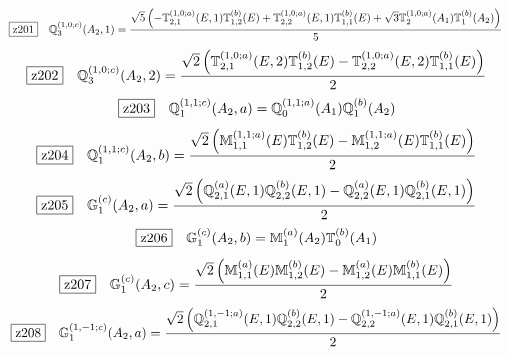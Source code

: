 \documentclass[fleqn,10pt,landscape]{jsarticle}
\begin{document}
\begin{dmath*}
\hspace*{3mm}\fbox{z201}\quad \mathbb{Q}_{3}^{(1,0;c)}(A_{2},1)=\frac{\sqrt{5} \left(- \mathbb{T}_{2,1}^{(1,0;a)}(E,1) \mathbb{T}_{1,2}^{(b)}(E) + \mathbb{T}_{2,2}^{(1,0;a)}(E,1) \mathbb{T}_{1,1}^{(b)}(E) + \sqrt{3} \mathbb{T}_{2}^{(1,0;a)}(A_{1}) \mathbb{T}_{1}^{(b)}(A_{2})\right)}{5}
\end{dmath*}
\begin{dmath*}
\hspace*{3mm}\fbox{z202}\quad \mathbb{Q}_{3}^{(1,0;c)}(A_{2},2)=\frac{\sqrt{2} \left(\mathbb{T}_{2,1}^{(1,0;a)}(E,2) \mathbb{T}_{1,2}^{(b)}(E) - \mathbb{T}_{2,2}^{(1,0;a)}(E,2) \mathbb{T}_{1,1}^{(b)}(E)\right)}{2}
\end{dmath*}
\begin{dmath*}
\hspace*{3mm}\fbox{z203}\quad \mathbb{Q}_{1}^{(1,1;c)}(A_{2},a)=\mathbb{Q}_{0}^{(1,1;a)}(A_{1}) \mathbb{Q}_{1}^{(b)}(A_{2})
\end{dmath*}
\begin{dmath*}
\hspace*{3mm}\fbox{z204}\quad \mathbb{Q}_{1}^{(1,1;c)}(A_{2},b)=\frac{\sqrt{2} \left(\mathbb{M}_{1,1}^{(1,1;a)}(E) \mathbb{T}_{1,2}^{(b)}(E) - \mathbb{M}_{1,2}^{(1,1;a)}(E) \mathbb{T}_{1,1}^{(b)}(E)\right)}{2}
\end{dmath*}
\begin{dmath*}
\hspace*{3mm}\fbox{z205}\quad \mathbb{G}_{1}^{(c)}(A_{2},a)=\frac{\sqrt{2} \left(\mathbb{Q}_{2,1}^{(a)}(E,1) \mathbb{Q}_{2,2}^{(b)}(E,1) - \mathbb{Q}_{2,2}^{(a)}(E,1) \mathbb{Q}_{2,1}^{(b)}(E,1)\right)}{2}
\end{dmath*}
\begin{dmath*}
\hspace*{3mm}\fbox{z206}\quad \mathbb{G}_{1}^{(c)}(A_{2},b)=\mathbb{M}_{1}^{(a)}(A_{2}) \mathbb{T}_{0}^{(b)}(A_{1})
\end{dmath*}
\begin{dmath*}
\hspace*{3mm}\fbox{z207}\quad \mathbb{G}_{1}^{(c)}(A_{2},c)=\frac{\sqrt{2} \left(\mathbb{M}_{1,1}^{(a)}(E) \mathbb{M}_{1,2}^{(b)}(E) - \mathbb{M}_{1,2}^{(a)}(E) \mathbb{M}_{1,1}^{(b)}(E)\right)}{2}
\end{dmath*}
\begin{dmath*}
\hspace*{3mm}\fbox{z208}\quad \mathbb{G}_{1}^{(1,-1;c)}(A_{2},a)=\frac{\sqrt{2} \left(\mathbb{Q}_{2,1}^{(1,-1;a)}(E,1) \mathbb{Q}_{2,2}^{(b)}(E,1) - \mathbb{Q}_{2,2}^{(1,-1;a)}(E,1) \mathbb{Q}_{2,1}^{(b)}(E,1)\right)}{2}
\end{dmath*}
\end{document}
